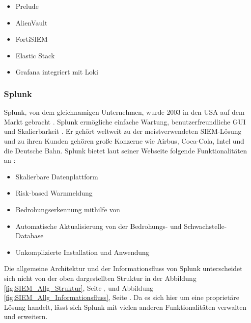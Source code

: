\begin{itemize}[noitemsep]
   \item Prelude %
   \item AlienVault  %
   \item FortiSIEM %
   \item Elastic Stack %
   \item Grafana integriert mit Loki %
\end{itemize}


\subsubsection{Splunk}
Splunk, von dem gleichnamigen Unternehmen, wurde 2003 in den USA auf dem Markt gebracht \citep{Splunk_splunk}. Splunk ermögliche einfache Wartung, benutzerfreundliche \gls{GUI} und Skalierbarkeit \citep{Kazarov_Splunk}. Er gehört weltweit zu der meistverwendeten \gls{SIEM}-Lösung und zu ihren Kunden gehören große Konzerne wie Airbus, Coca-Cola, Intel und die Deutsche Bahn. Splunk bietet laut seiner Webseite folgende Funktionalitäten an \citep{Splunk_SPE}:

\begin{itemize}[noitemsep]
   \item Skalierbare Datenplattform 
   \item Risk-based Warnmeldung  
   \item Bedrohungserkennung mithilfe von  
   \item Automatische Aktualisierung von der Bedrohungs- und Schwachstelle-Database 
   \item Unkomplizierte Installation und Anwendung 
\end{itemize}

Die allgemeine Architektur und der Informationsfluss von Splunk unterscheidet sich nicht von der oben dargestellten Struktur in der Abbildung \ref{fig:SIEM_Allg_Struktur}, Seite \pageref{fig:SIEM_Allg_Struktur}, und Abbildung \ref{fig:SIEM_Allg_Informationsfluss}, Seite \pageref{fig:SIEM_Allg_Informationsfluss}. Da es sich hier um eine proprietäre Lösung handelt, lässt sich Splunk mit vielen anderen Funktionalitäten verwalten und erweitern. 

